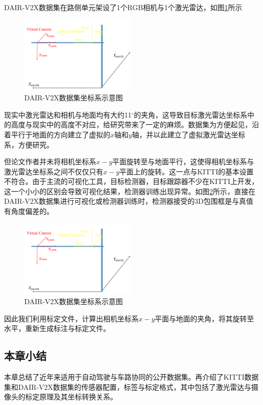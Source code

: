 DAIR-V2X数据集在路侧单元架设了1个RGB相机与1个激光雷达，如图\ref{fig6}所示

\begin{figure}[htb] 
    \center
    \includegraphics[width=0.5\textwidth]{figure/fig6.png}
    \caption{DAIR-V2X数据集坐标系示意图}
    \label{fig6}
\end{figure}

现实中激光雷达和相机与地面均有大约11$^\circ$的夹角，这导致目标激光雷达坐标系中的高度与现实中的高度不对应，给研究带来了一定的麻烦。数据集为方便起见，沿着平行于地面的方向建立了虚拟的$x$轴和$y$轴，并以此建立了虚拟激光雷达坐标系，方便研究。

但论文作者并未将相机坐标系$x-y$平面旋转至与地面平行，这使得相机坐标系与激光雷达坐标系之间不仅仅只有$x-y$平面上的旋转。这一点与KITTI的基本设置不符合。由于主流的可视化工具，目标检测器，目标跟踪器不少在KITTI上开发，这一个小小的区别会导致可视化结果，检测器训练出现异常。如图\ref{fig7}所示，直接在DAIR-V2X数据集进行可视化或检测器训练时，检测器接受的3D包围框是与真值有角度偏差的。

\begin{figure}[htb] 
    \center
    \includegraphics[width=0.5\textwidth]{figure/fig6.png}
    \caption{DAIR-V2X数据集坐标系示意图}
    \label{fig7}
\end{figure}

因此我们利用标定文件，计算出相机坐标系$x-y$平面与地面的夹角，将其旋转至水平，重新生成标注与标定文件。

\subsection{本章小结}

本章总结了近年来适用于自动驾驶与车路协同的公开数据集。再介绍了KITTI数据集和DAIR-V2X数据集的传感器配置，标签与标定格式，其中包括了激光雷达与摄像头的标定原理及其坐标转换关系。